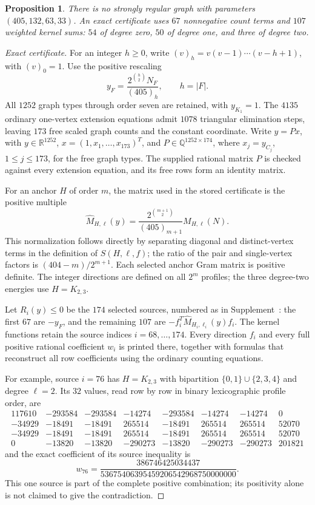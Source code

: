 \documentclass[11pt]{article}
\newtheorem{proposition}[theorem]{Proposition}
\theoremstyle{remark}
\newcommand{\R}{\mathbb R}
\newcommand{\Q}{\mathbb Q}
\numberwithin{equation}{section}
\begin{document}
\begin{proposition}\label{prop:405-counting}
There is no strongly regular graph with parameters $(405,132,63,33)$.
An exact certificate uses $67$ nonnegative count terms and $107$
weighted kernel sums: $54$ of degree zero, $50$ of degree one, and three
of degree two.
\end{proposition}
\begin{proof}[Exact certificate]
For an integer $h\ge0$, write $(v)_h=v(v-1)\cdots(v-h+1)$,
with $(v)_0=1$. Use the positive rescaling
\[
 y_F=\frac{2^{\binom h2}N_F}{(405)_h},\qquad h=|F|.
\]
All $1252$ graph types through order seven are retained, with
$y_{K_1}=1$.  The $4135$ ordinary one-vertex extension equations
admit $1078$ triangular elimination steps, leaving $173$ free
scaled graph counts and the constant coordinate. Write
$y=Px$, with $y\in\R^{1252}$,
$x=(1,x_1,\ldots,x_{173})^T$, and $P\in\Q^{1252\times174}$,
where $x_j=y_{C_j}$, $1\le j\le173$, for the free graph types.
The supplied rational matrix $P$ is checked against every
extension equation, and its free rows form an identity matrix.

For an anchor $H$ of order $m$, the matrix used in the stored
certificate is the positive multiple
\[
 \widehat M_{H,\ell}(y)=
 \frac{2^{\binom{m+1}{2}}}{(405)_{m+1}}M_{H,\ell}(N).
\]
This normalization follows directly by separating diagonal and distinct-vertex terms
in the definition of $S(H,\ell,f)$; the ratio of the
pair and single-vertex factors is $(404-m)/2^{m+1}$.
Each selected anchor Gram matrix is positive definite. The integer
directions are defined on all $2^m$ profiles; the three degree-two
energies use $H=K_{2,3}$.

Let $R_i(y)\le0$ be the $174$ selected sources, numbered as in
Supplement~\cite{supp405}: the first $67$ are $-y_F$, and the
remaining $107$ are $-f_i^T\widehat M_{H_i,\ell_i}(y)f_i$.
The kernel functions retain the source indices $i=68,\ldots,174$.
Every direction $f_i$ and every full positive rational coefficient
$w_i$ is printed there, together with formulas that reconstruct
all row coefficients using the ordinary counting equations.

For example, source $i=76$ has $H=K_{2,3}$ with bipartition
$\{0,1\}\cup\{2,3,4\}$ and degree $\ell=2$. Its $32$ values,
read row by row in binary lexicographic profile order, are
\[
 {\begin{array}{rrrrrrrr}
 117610&-293584&-293584&-14274&-293584&-14274&-14274&0\\
 -34929&-18491&-18491&265514&-18491&265514&265514&52070\\
 -34929&-18491&-18491&265514&-18491&265514&265514&52070\\
 0&-13820&-13820&-290273&-13820&-290273&-290273&201821
 \end{array}}
\]
and the exact coefficient of its source inequality is
\[
 w_{76}=\frac{386746425034437}{53675406395459206542968750000000}.
\]
This one source is part of the complete positive combination; its
positivity alone is not claimed to give the contradiction.


\end{proof}
\end{document}
